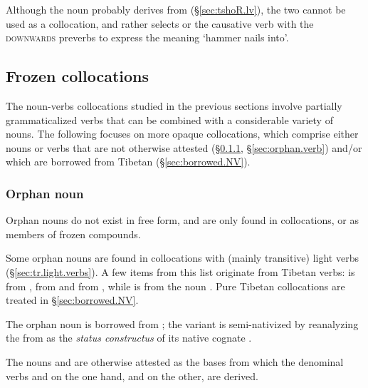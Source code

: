  Although the noun  probably derives from  (§\ref{sec:tshoR.lv}), the two cannot be used as a collocation, and  rather selects  or the causative verb  with the \textsc{downwards} preverbs to express the meaning `hammer nails into'.
 
\subsection{Frozen collocations} \label{sec:frozen.collocations}
The noun-verbs collocations studied in the previous sections involve partially grammaticalized verbs that can be combined with a considerable variety of nouns. The following focuses on more opaque collocations, which comprise either nouns or verbs that are not otherwise attested (§\ref{sec:orphan.noun}, §\ref{sec:orphan.verb}) and/or which are borrowed from Tibetan (§\ref{sec:borrowed.NV}).
 
\subsubsection{Orphan noun} \label{sec:orphan.noun}
Orphan nouns do not exist in free form, and are only found in collocations, or as members of frozen compounds.

Some orphan nouns are found in collocations with (mainly transitive) light verbs (§\ref{sec:tr.light.verbs}). A few items from this list originate from Tibetan verbs:  is from ,  from  and  from , while   is from the noun . Pure Tibetan collocations are treated in §\ref{sec:borrowed.NV}. 

The orphan noun  is borrowed from ; the variant   is semi-nativized by reanalyzing the  from  as the \textit{status constructus}  of its native cognate . 

The nouns  and  are otherwise attested as the bases from which the denominal verbs  and  on the one hand, and  on the other, are derived.  

